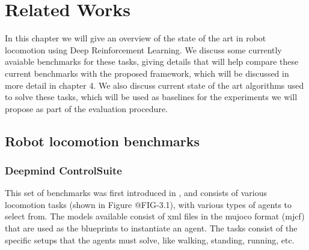 
\chapter{Related Works}
\label{ch:relatedWorks}



In this chapter we will give an overview of the state of the art in robot locomotion using 
Deep Reinforcement Learning. We discuss some currently avaiable benchmarks for these tasks,
giving details that will help compare these current benchmarks with the proposed framework, which
will be discussed in more detail in chapter 4. We also discuss current state of the art algorithms
used to solve these tasks, which will be used as baselines for the experiments we will propose as part
of the evaluation procedure.

\section{Robot locomotion benchmarks}

\subsection{Deepmind ControlSuite}

This set of benchmarks was first introduced in \cite{Controlsuite}, and consists 
of various locomotion tasks (shown in Figure @FIG-3.1), with various types of agents 
to select from. The models available consist of xml files in the mujoco format (mjcf) 
that are used as the blueprints to instantiate an agent. The tasks consist of the specific
setups that the agents must solve, like walking, standing, running, etc.

